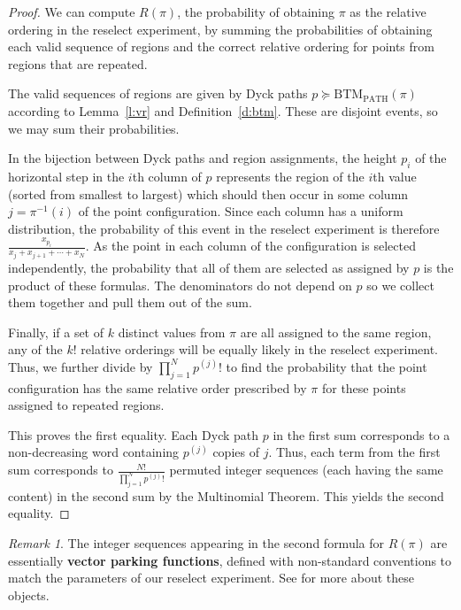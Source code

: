 \documentclass[11pt]{amsart}   %
\theoremstyle{definition}
\theoremstyle{remark}
\newtheorem{remark}[theorem]{Remark}
\numberwithin{equation}{section}
\theoremstyle{theorem}
\newcommand{\BTMP}{\mathrm{BTM_{PATH}}}
\newcommand{\pgeq}{\succcurlyeq}
\begin{document}
\begin{proof}
We can compute $R(\pi)$, the probability of obtaining $\pi$ as the
relative ordering in the reselect experiment, by summing the probabilities of
obtaining each valid sequence of regions and the correct relative ordering for
points from regions that are repeated.

The valid sequences of regions are given by Dyck paths $p \pgeq \BTMP(\pi)$
according to Lemma~\ref{l:vr} and Definition~\ref{d:btm}.  These are disjoint
events, so we may sum their probabilities.

In the bijection between Dyck paths and region assignments, the height $p_i$ of
the horizontal step in the $i$th column of $p$ represents the region of the
$i$th value (sorted from smallest to largest) which should then occur in some
column $j = \pi^{-1}(i)$ of the point configuration.  Since each column has a
uniform distribution, the probability of this event in the reselect experiment
is therefore $\frac{x_{p_i}}{x_j + x_{j+1} + \cdots + x_N}$.  As the point in
each column of the configuration is selected independently, the probability
that all of them are selected as assigned by $p$ is the product of these
formulas.  The denominators do not depend on $p$ so we collect them together
and pull them out of the sum.

Finally, if a set of $k$ distinct values from $\pi$ are all assigned to the
same region, any of the $k!$ relative orderings will be equally likely in the
reselect experiment.  Thus, we further divide by $\prod_{j=1}^N p^{(j)}!$ to
find the probability that the point configuration has the same relative order
prescribed by $\pi$ for these points assigned to repeated regions.

This proves the first equality.  Each Dyck path $p$ in the first sum
corresponds to a non-decreasing word containing $p^{(j)}$ copies of $j$.  Thus,
each term from the first sum corresponds to $\frac{N!}{\prod_{j=1}^N p^{(j)}!}$
permuted integer sequences (each having the same content) in the second sum by
the Multinomial Theorem.  This yields the second equality.
\end{proof}

\begin{remark}
The integer sequences appearing in the second formula for $R(\pi)$ are
essentially {\bf vector parking functions}, defined with non-standard
conventions to match the parameters of our reselect experiment.  See \cite{yan,
pitman--stanley} for more about these objects.
\end{remark}
\end{document}
